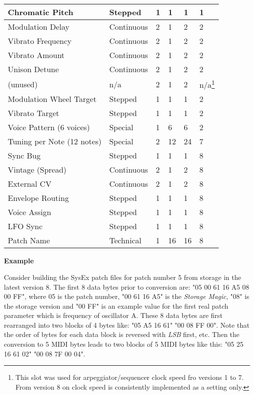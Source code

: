 \begin{longtable}[l]{p{5cm}|p{2cm}|p{1.5cm}|p{1.5cm}|p{2cm}|p{2.5cm}}
Chromatic Pitch & Stepped & 1 & 1 & 1 & 1 \\ \hline
Modulation Delay & Continuous & 2 & 1 & 2 & 2 \\ \hline
Vibrato Frequency & Continuous & 2 & 1 & 2 & 2 \\ \hline
Vibrato Amount & Continuous & 2 & 1 & 2 & 2 \\ \hline
Unison Detune & Continuous & 2 & 1 & 2 & 2 \\ \hline
(unused) & n/a & 2 & 1 & 2 & n/a\footnote{This slot was used for arpeggiator/sequencer clock speed fro versions 1 to 7. From version 8 on clock speed is consistently implemented as a setting only.} \\ \hline
Modulation Wheel Target & Stepped & 1 & 1 & 1 & 2 \\ \hline
Vibrato Target & Stepped & 1 & 1 & 1 & 2 \\ \hline
Voice Pattern (6 voices) & Special & 1 & 6 & 6 & 2 \\ \hline
Tuning per Note (12 notes) & Special & 2 & 12 & 24 & 7 \\ \hline
Sync Bug & Stepped & 1 & 1 & 1 & 8 \\ \hline
Vintage (Spread) & Continuous & 2 & 1 & 2 & 8 \\ \hline
External CV & Continuous & 2 & 1 & 2 & 8 \\ \hline
Envelope Routing & Stepped & 1 & 1 & 1 & 8 \\ \hline
Voice Assign & Stepped & 1 & 1 & 1 & 8 \\ \hline
LFO Sync & Stepped & 1 & 1 & 1 & 8 \\ \hline
Patch Name & Technical & 1 & 16 & 16 & 8 \\
\end{longtable}

\textbf{Example}

Consider building the SysEx patch files for patch number 5 from storage in the latest version 8. The first 8 data bytes prior to conversion are: "05 00 61 16 A5 08 00 FF", where 05 is the patch number, "00 61 16 A5" is the \textit{Storage Magic}, "08" is the storage version and "00 FF" is an example value for the first real patch parameter which is frequency of oscillator A. These 8 data bytes are first rearranged into two blocks of 4 bytes like: "05 A5 16 61" "00 08 FF 00". Note that the order of bytes for each data block is reversed with \textit{LSB} first, etc. Then the conversion to 5 MIDI bytes leads to two blocks of 5 MIDI bytes like this: "05 25 16 61 02" "00 08 7F 00 04".

